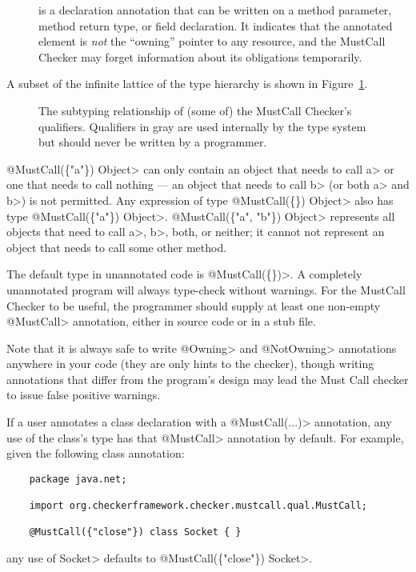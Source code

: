 \begin{description}
\item[]
  is a declaration annotation that can be written on a method parameter, method return type, or
  field declaration. It indicates that the annotated element is \emph{not} the ``owning'' pointer to any resource,
  and the MustCall Checker may forget information about its obligations temporarily.

\end{description}

A subset of the infinite lattice of the type hierarchy is shown in Figure~\ref{fig-must-call-hierarchy}.

\begin{figure}
\caption{The subtyping relationship of (some of) the MustCall Checker's qualifiers.
Qualifiers in gray are used internally by the type system but should
never be written by a programmer.}
\label{fig-must-call-hierarchy}
\end{figure}

\<@MustCall(\{"a"\}) Object> can only
contain an object that needs to call \<a> or one that needs to call nothing --- an
object that needs to call \<b> (or both \<a> and \<b>) is not permitted.
Any expression of type \<@MustCall(\{\}) Object> also has type
\<@MustCall(\{"a"\}) Object>.
\<@MustCall(\{"a", "b"\}) Object> represents all objects that need to
call \<a>, \<b>, both, or neither; it cannot not represent an object that needs
to call some other method.

The default type in unannotated code is \<@MustCall(\{\})>.
A completely unannotated program will always type-check without warnings.
For the MustCall Checker to be useful, the programmer should supply at least one non-empty
\<@MustCall> annotation, either in source code or in a stub file.

Note that it is always safe to write \<@Owning> and \<@NotOwning>
annotations anywhere in your code (they are only hints to the checker),
though writing annotations that differ from the program's design may lead
the Must Call checker to issue false positive warnings.



If a user annotates a class declaration with a \<@MustCall(...)> annotation, any use of the class's
type has that \<@MustCall> annotation by default. For example, given the following class annotation:
\begin{Verbatim}
    package java.net;

    import org.checkerframework.checker.mustcall.qual.MustCall;

    @MustCall({"close"}) class Socket { }
\end{Verbatim}
any use of \<Socket> defaults to \<@MustCall(\{"close"\}) Socket>.

